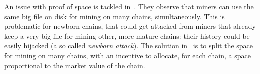 

An issue with proof of space is tackled in~\cite{TangZDWLG0L19}.
They observe that miners can use the same big file on disk
for mining on many chains, simultaneously. This is problematic for newborn chains, that could
get attacked from miners that already keep a very big file for mining other,
more mature chains: their history could be easily hijacked
(a so called \emph{newborn attack}). The solution in~\cite{TangZDWLG0L19} is
to split the space for mining on many chains, with an
incentive to allocate, for each chain, a space proportional
to the market value of the chain.

